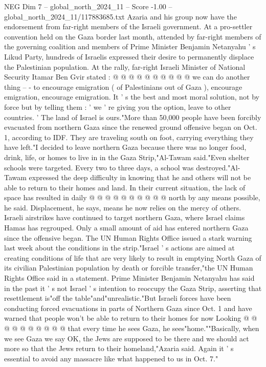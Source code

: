\begin{textsample}{NEG Dim 7 – global\_north\_2024\_11 – Score -1.00 – global\_north\_2024\_11/117883685.txt}
Azaria and his group now have the endorsement from far-right members of the Israeli government.
At a pro-settler convention held on the Gaza border last month, attended by far-right members of the governing coalition and members of Prime Minister Benjamin Netanyahu ' s Likud Party, hundreds of Israelis expressed their desire to permanently displace the Palestinian population.
At the rally, far-right Israeli Minister of National Security Itamar Ben Gvir stated : @ @ @ @ @ @ @ @ @ @ we can do another thing -- - to encourage emigration ( of Palestinians out of Gaza ), encourage emigration, encourage emigration.
It ' s the best and most moral solution, not by force but by telling them : ' we ' re giving you the option, leave to other countries. ' The land of Israel is ours."More than 50,000 people have been forcibly evacuated from northern Gaza since the renewed ground offensive began on Oct. 1, according to IDF.
They are traveling south on foot, carrying everything they have left."I decided to leave northern Gaza because there was no longer food, drink, life, or homes to live in in the Gaza Strip,"Al-Tawam said."Even shelter schools were targeted.
Every two to three days, a school was destroyed."Al-Tawam expressed the deep difficulty in knowing that he and others will not be able to return to their homes and land.
In their current situation, the lack of space has resulted in daily @ @ @ @ @ @ @ @ @ @ north by any means possible, he said.
Displacement, he says, means he now relies on the mercy of others.
Israeli airstrikes have continued to target northern Gaza, where Israel claims Hamas has regrouped.
Only a small amount of aid has entered northern Gaza since the offensive began.
The UN Human Rights Office issued a stark warning last week about the conditions in the strip."Israel ' s actions are aimed at creating conditions of life that are very likely to result in emptying North Gaza of its civilian Palestinian population by death or forcible transfer,"the UN Human Rights Office said in a statement.
Prime Minister Benjamin Netanyahu has said in the past it ' s not Israel ' s intention to reoccupy the Gaza Strip, asserting that resettlement is"off the table"and"unrealistic."But Israeli forces have been conducting forced evacuations in parts of Northern Gaza since Oct. 1 and have warned that people won't be able to return to their homes for now Looking @ @ @ @ @ @ @ @ @ @ that every time he sees Gaza, he sees"home.""Basically, when we see Gaza we say OK, the Jews are supposed to be there and we should act more so that the Jews return to their homeland,"Azaria said.
Again it ' s essential to avoid any massacre like what happened to us in Oct. 7."

\end{textsample}
